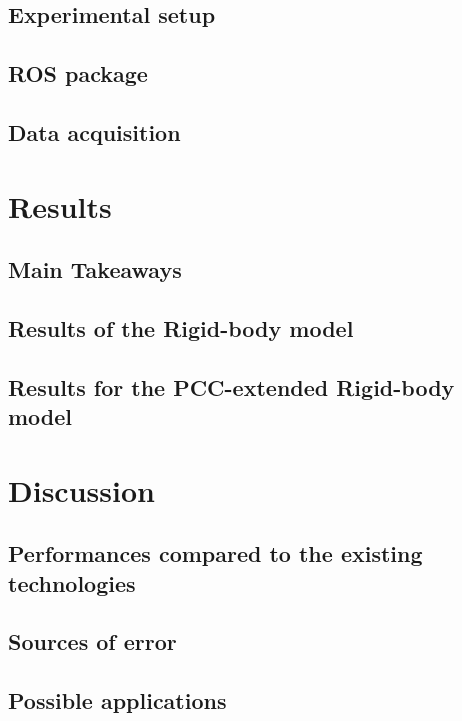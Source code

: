 \documentclass[12pt]{article}
\begin{document}
\subsection{Experimental setup}

\subsection{ROS package}

\subsection{Data acquisition}


\section{Results}
\subsection{Main Takeaways}

\subsection{Results of the Rigid-body model}

\subsection{Results for the PCC-extended Rigid-body model}



\section{Discussion}
\subsection{Performances compared to the existing technologies}

\subsection{Sources of error}

\subsection{Possible applications}

\end{document}
